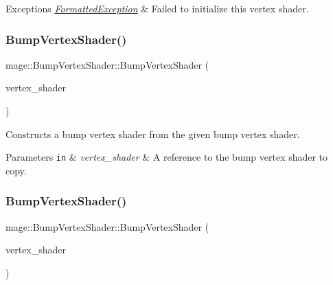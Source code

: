 \begin{DoxyExceptions}{Exceptions}
{\em \hyperlink{structmage_1_1_formatted_exception}{Formatted\+Exception}} & Failed to initialize this vertex shader. \\
\hline
\end{DoxyExceptions}
\hypertarget{classmage_1_1_bump_vertex_shader_abb1bc40546871490c44d14dbe17303b2}{}\label{classmage_1_1_bump_vertex_shader_abb1bc40546871490c44d14dbe17303b2} 
\subsubsection{\texorpdfstring{Bump\+Vertex\+Shader()}{BumpVertexShader()}\hspace{0.1cm}{\footnotesize\ttfamily [3/4]}}
{\footnotesize\ttfamily mage\+::\+Bump\+Vertex\+Shader\+::\+Bump\+Vertex\+Shader (\begin{DoxyParamCaption}\item[{const \hyperlink{classmage_1_1_bump_vertex_shader}{Bump\+Vertex\+Shader} \&}]{vertex\+\_\+shader }\end{DoxyParamCaption})\hspace{0.3cm}{\ttfamily [delete]}}

Constructs a bump vertex shader from the given bump vertex shader.


\begin{DoxyParams}[1]{Parameters}
\mbox{\tt in}  & {\em vertex\+\_\+shader} & A reference to the bump vertex shader to copy. \\
\hline
\end{DoxyParams}
\hypertarget{classmage_1_1_bump_vertex_shader_aa94f0403d19493070c6b061b5dc76f76}{}\label{classmage_1_1_bump_vertex_shader_aa94f0403d19493070c6b061b5dc76f76} 
\subsubsection{\texorpdfstring{Bump\+Vertex\+Shader()}{BumpVertexShader()}\hspace{0.1cm}{\footnotesize\ttfamily [4/4]}}
{\footnotesize\ttfamily mage\+::\+Bump\+Vertex\+Shader\+::\+Bump\+Vertex\+Shader (\begin{DoxyParamCaption}\item[{\hyperlink{classmage_1_1_bump_vertex_shader}{Bump\+Vertex\+Shader} \&\&}]{vertex\+\_\+shader }\end{DoxyParamCaption})\hspace{0.3cm}{\ttfamily [default]}}

